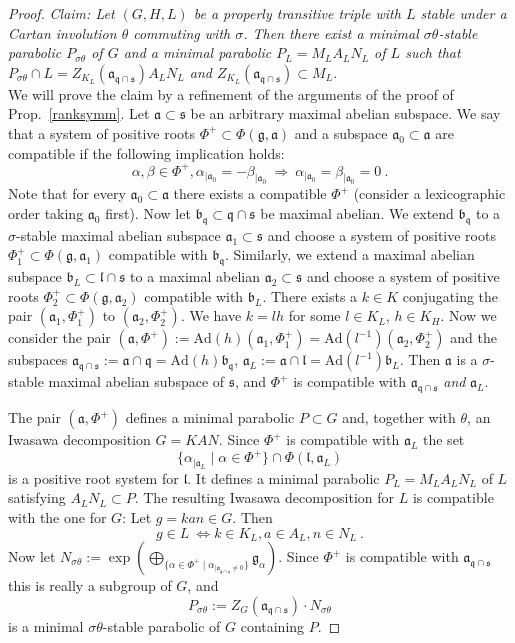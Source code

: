 \documentclass[10]{amsart}
\theoremstyle{remark}
\theoremstyle{definition}
\numberwithin{equation}{section}
\newcommand{\Ad}{\text{Ad}}
\newcommand{\fa}{{\mathfrak a}}             %
\newcommand{\fb}{{\mathfrak b}}
\newcommand{\fg}{{\mathfrak g}}
\newcommand{\fl}{{\mathfrak l}}
\newcommand{\fq}{{\mathfrak q}}
\newcommand{\fs}{{\mathfrak s}}
\newcommand{\gt}{\theta}
\begin{document}
{\begin{proof}
{\it Claim: Let $(G,H,L)$ be a properly transitive triple with $L$ stable under a Cartan involution $\theta$ commuting with $\sigma$. Then there exist a minimal $\sigma\theta$-stable parabolic $P_{\sigma\gt}$ of $G$ and a minimal parabolic $P_L=M_LA_LN_L$ of $L$ such that $P_{\sigma\gt}\cap L= Z_{K_L}({\mathfrak a}_{{\mathfrak q}\cap{\mathfrak s}})A_LN_L$ and $Z_{K_L}({\mathfrak a}_{{\mathfrak q}\cap{\mathfrak s}})\subset M_L$.}\\
We will prove the claim by a refinement of the arguments of the proof of Prop.~\ref{ranksymm}. Let $\fa\subset\fs$ be an arbitrary maximal abelian subspace. We say that a system of positive roots $\Phi^+\subset\Phi(\fg,\fa)$ and a subspace $\fa_0\subset\fa$ are compatible if the following implication holds:
$$ \alpha,\beta\in\Phi^+, \alpha_{|\fa_0}=-\beta_{|\fa_0}\ \Rightarrow\  \alpha_{|\fa_0}=\beta_{|\fa_0}=0\ .$$
Note that for every $\fa_0\subset\fa$ there exists a compatible $\Phi^+$ (consider a lexicographic order taking $\fa_0$ first). Now let $\fb_\fq\subset \fq\cap\fs$ be maximal abelian.
We extend $\fb_\fq$ to a $\sigma$-stable maximal abelian subspace $\fa_1\subset\fs$ and choose a system of positive roots $\Phi_1^+\subset\Phi(\fg,\fa_1)$ compatible with $\fb_\fq$.
Similarly, we extend a maximal abelian subspace $\fb_L\subset\fl\cap\fs$ to a maximal abelian $\fa_2\subset \fs$ and choose a system of positive roots $\Phi_2^+\subset\Phi(\fg,\fa_2)$
compatible with $\fb_L$. There exists a $k\in K$ conjugating the pair $(\fa_1,\Phi_1^+)$ to $(\fa_2,\Phi_2^+)$. We have $k=lh$ for some $l\in K_L$, $h\in K_H$.
Now we consider the pair $(\fa,\Phi^+):=\Ad(h)(\fa_1,\Phi_1^+)=\Ad(l^{-1})(\fa_2,\Phi_2^+)$ and the subspaces $\fa_{\fq\cap\fs}:=\fa\cap\fq=\Ad(h)\fb_\fq$, 
$\fa_L:=\fa\cap\fl=\Ad(l^{-1})\fb_L$. Then $\fa$ is a $\sigma$-stable maximal abelian subspace of $\fs$, and $\Phi^+$ is compatible with $\fa_{\fq\cap\fs}$ {\it and} $\fa_L$.

The pair $(\fa,\Phi^+)$ defines a minimal parabolic $P\subset G$ and, together with $\theta$, an Iwasawa decomposition $G=KAN$. Since $\Phi^+$ is compatible with $\fa_L$
the set 
$$ \{\alpha_{|\fa_L}\mid \alpha\in \Phi^+\}\cap \Phi(\fl, \fa_L)$$
is a positive root system for $\fl$. It defines a minimal parabolic $P_L=M_LA_LN_L$ of $L$ satisfying $A_LN_L\subset P$. The resulting Iwasawa decomposition for $L$ is compatible
with the one for $G$: Let $g=kan\in G$. Then
$$  g\in L\ \Leftrightarrow k\in K_L, a\in A_L, n\in N_L\ .$$
Now let $\displaystyle N_{\sigma\gt}:=\exp\left ( \bigoplus_{\{\alpha\in\Phi^+\mid \alpha_{|\fa_{\fq\cap\fs}\ne 0}\}} \fg_\alpha\right )$. Since $\Phi^+$ is compatible with $\fa_{\fq\cap\fs}$ this is really a subgroup of $G$, and
$$ P_{\sigma\gt}:=Z_G(\fa_{\fq\cap\fs})\cdot N_{\sigma\gt}$$
is a minimal $\sigma\theta$-stable parabolic of $G$ containing $P$.


\end{proof}}
\end{document}
